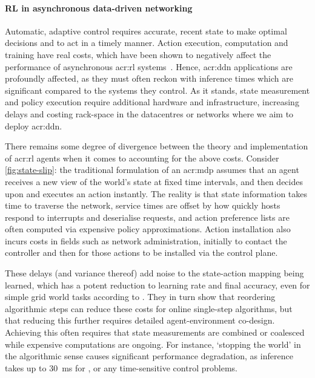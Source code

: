 \paragraph{RL in asynchronous data-driven networking}
Automatic, adaptive control requires accurate, recent state to make optimal decisions and to act in a timely manner.
Action execution, computation and training have real costs, which have been shown to negatively affect the performance of asynchronous \gls{acr:rl} systems~\parencite{DBLP:journals/firai/TravnikMSP18}.
Hence, \gls{acr:ddn} applications are profoundly affected, as they must often reckon with inference times which are significant compared to the systems they control.
As it stands, state measurement and policy execution require additional hardware and infrastructure, increasing delays and costing rack-space in the datacentres or networks where we aim to deploy \gls{acr:ddn}.

There remains some degree of divergence between the theory and implementation of \gls{acr:rl} agents when it comes to accounting for the above costs.
Consider \cref{fig:state-slip}: the traditional formulation of an \gls{acr:mdp} assumes that an agent receives a new view of the world's state at fixed time intervals, and then decides upon and executes an action instantly.
The reality is that state information takes time to traverse the network, service times are offset by how quickly hosts respond to interrupts and deserialise requests, and action preference lists are often computed via expensive policy approximations.
Action installation also incurs costs in fields such as network administration, initially to contact the controller and then for those actions to be installed via the control plane.

These delays (and variance thereof) add noise to the state-action mapping being learned, which has a potent reduction to learning rate and final accuracy, even for simple grid world tasks according to \textcite{DBLP:journals/firai/TravnikMSP18}.
They in turn show that reordering algorithmic steps can reduce these costs for online single-step algorithms, but that reducing this further requires detailed agent-environment co-design.
Achieving this often requires that state measurements are combined or coalesced~\parencite{DBLP:journals/corr/abs-1910-04054,DBLP:journals/tnsm/SimpsonRP20} while expensive computations are ongoing.
For instance, `stopping the world' in the algorithmic sense causes significant performance degradation, as inference takes up to \SI{30}{\milli\second} for \citeauthor{DBLP:journals/corr/abs-1910-04054}, or any time-sensitive control problems.

